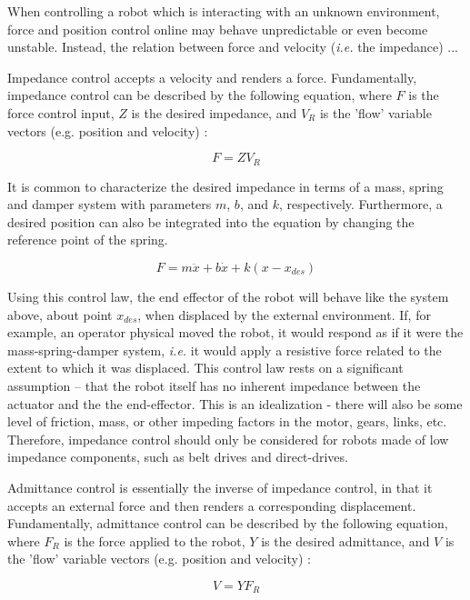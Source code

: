 \documentclass[12pt]{report}
\begin{document}
When controlling a robot which is interacting with an unknown environment, force and position control online may behave unpredictable or even become unstable. Instead, the relation between force and velocity (\textit{i.e.} the impedance) ...


Impedance control accepts a velocity and renders a force. Fundamentally, impedance control can be described by the following equation, where $F$ is the force control input, $Z$ is the desired impedance, and $V_R$ is the 'flow' variable vectors (e.g. position and velocity) :

\begin{equation}
	F = ZV_R 
\end{equation} 

It is common to characterize the desired impedance in terms of a mass, spring and damper system with parameters $m$, $b$, and $k$, respectively. Furthermore, a desired position can also be integrated into the equation by changing the reference point of the spring. 

\begin{equation}
	F = m\ddot{x} + b\dot{x} + k(x - x_{des})
\end{equation} 

Using this control law, the end effector of the robot will behave like the system above, about point $x_{des}$, when displaced by the external environment. If, for example, an operator physical moved the robot, it would respond as if it were the mass-spring-damper system, \textit{i.e.} it would apply a resistive force related to the extent to which it was displaced. 
	This control law rests on a significant assumption -- that the robot itself has no inherent impedance between the actuator and the the end-effector. This is an idealization - there will also be some level of friction, mass, or other impeding factors in the motor, gears, links, etc. Therefore, impedance control should only be considered for robots made of low impedance components, such as belt drives and direct-drives. 
	
	Admittance control is essentially the inverse of impedance control, in that it accepts an external force and then renders a corresponding displacement. Fundamentally, admittance control can be described by the following equation, where $F_R$ is the force applied to the robot, $Y$ is the desired admittance, and $V$ is the 'flow' variable vectors (e.g. position and velocity) :
	
	\begin{equation}
	V = YF_R 
	\end{equation} 
	
\end{document}
